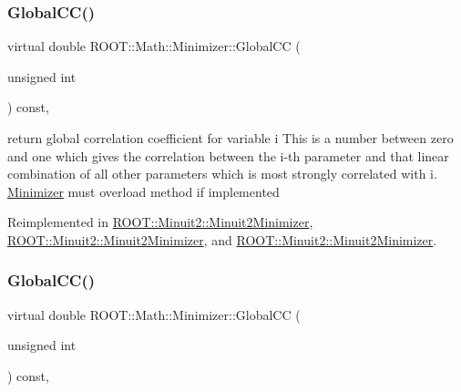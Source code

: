 \mbox{\label{classROOT_1_1Math_1_1Minimizer_a6b50b0b0ccb0cb23da281ef978d145c5}} 
\subsubsection{\texorpdfstring{GlobalCC()}{GlobalCC()}\hspace{0.1cm}{\footnotesize\ttfamily [1/3]}}
{\footnotesize\ttfamily virtual double R\+O\+O\+T\+::\+Math\+::\+Minimizer\+::\+Global\+CC (\begin{DoxyParamCaption}\item[{unsigned int}]{ }\end{DoxyParamCaption}) const\hspace{0.3cm}{\ttfamily [inline]}, {\ttfamily [virtual]}}

return global correlation coefficient for variable i This is a number between zero and one which gives the correlation between the i-\/th parameter and that linear combination of all other parameters which is most strongly correlated with i. \mbox{\hyperlink{classROOT_1_1Math_1_1Minimizer}{Minimizer}} must overload method if implemented 

Reimplemented in \mbox{\hyperlink{classROOT_1_1Minuit2_1_1Minuit2Minimizer_adde21edb0a67e0eef950049528cfb9a7}{R\+O\+O\+T\+::\+Minuit2\+::\+Minuit2\+Minimizer}}, \mbox{\hyperlink{classROOT_1_1Minuit2_1_1Minuit2Minimizer_adde21edb0a67e0eef950049528cfb9a7}{R\+O\+O\+T\+::\+Minuit2\+::\+Minuit2\+Minimizer}}, and \mbox{\hyperlink{classROOT_1_1Minuit2_1_1Minuit2Minimizer_adde21edb0a67e0eef950049528cfb9a7}{R\+O\+O\+T\+::\+Minuit2\+::\+Minuit2\+Minimizer}}.

\mbox{\label{classROOT_1_1Math_1_1Minimizer_a6b50b0b0ccb0cb23da281ef978d145c5}} 
\subsubsection{\texorpdfstring{GlobalCC()}{GlobalCC()}\hspace{0.1cm}{\footnotesize\ttfamily [2/3]}}
{\footnotesize\ttfamily virtual double R\+O\+O\+T\+::\+Math\+::\+Minimizer\+::\+Global\+CC (\begin{DoxyParamCaption}\item[{unsigned int}]{ }\end{DoxyParamCaption}) const\hspace{0.3cm}{\ttfamily [inline]}, {\ttfamily [virtual]}}

